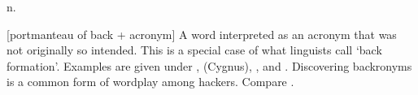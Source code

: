  n.

[portmanteau of back + acronym] A word interpreted as an acronym that was not
originally so intended. This is a special case of what linguists call `back
formation'. Examples are given under ,  (Cygnus), , and . Discovering
backronyms is a common form of wordplay among hackers. Compare
.


